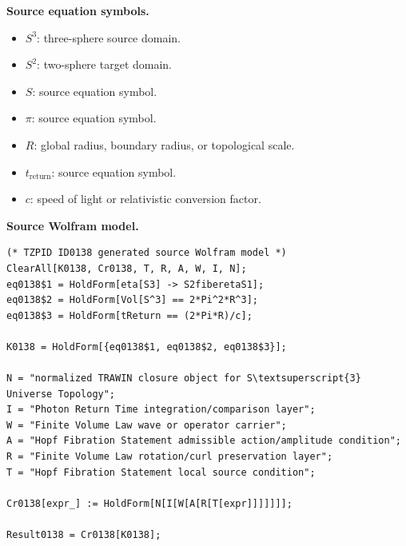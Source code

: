 \begin{minipage}[t]{0.49\linewidth}
\begingroup
\small
\raggedright
\textbf{Source equation symbols.}\par
\begin{itemize}[leftmargin=1.35em,itemsep=1pt,topsep=1pt,parsep=0pt]
    \item $S^3$: three-sphere source domain.
    \item $S^2$: two-sphere target domain.
    \item $S$: source equation symbol.
    \item $\pi$: source equation symbol.
    \item $R$: global radius, boundary radius, or topological scale.
    \item $t_{\mathrm{return}}$: source equation symbol.
    \item $c$: speed of light or relativistic conversion factor.
\end{itemize}
\endgroup
\end{minipage}\hfill
\begin{minipage}[t]{0.47\linewidth}
\begingroup
\scriptsize
\raggedright
\textbf{Source Wolfram model.}\par
\begin{Verbatim}[fontsize=\tiny,breaklines=true,breakanywhere=true]
(* TZPID ID0138 generated source Wolfram model *)
ClearAll[K0138, Cr0138, T, R, A, W, I, N];
eq0138$1 = HoldForm[eta[S3] -> S2fiberetaS1];
eq0138$2 = HoldForm[Vol[S^3] == 2*Pi^2*R^3];
eq0138$3 = HoldForm[tReturn == (2*Pi*R)/c];

K0138 = HoldForm[{eq0138$1, eq0138$2, eq0138$3}];

N = "normalized TRAWIN closure object for S\textsuperscript{3} Universe Topology";
I = "Photon Return Time integration/comparison layer";
W = "Finite Volume Law wave or operator carrier";
A = "Hopf Fibration Statement admissible action/amplitude condition";
R = "Finite Volume Law rotation/curl preservation layer";
T = "Hopf Fibration Statement local source condition";

Cr0138[expr_] := HoldForm[N[I[W[A[R[T[expr]]]]]]];

Result0138 = Cr0138[K0138];
\end{Verbatim}
\endgroup
\end{minipage}

